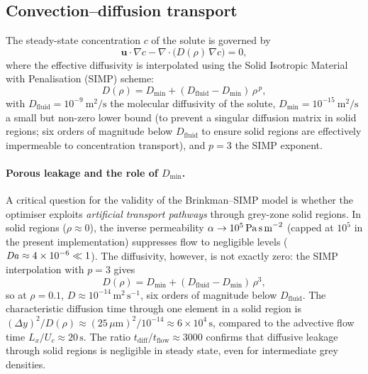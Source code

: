 \subsection{Convection--diffusion transport}
\label{sec:convdiff}
The steady-state concentration \(c\) of the solute is governed by
\begin{equation}
    \mathbf{u}\cdot\nabla c - \nabla\cdot\bigl(D(\rho)\,\nabla c\bigr) = 0,
    \label{eq:convdiff}
\end{equation}
where the effective diffusivity is interpolated using the Solid Isotropic Material with Penalisation (SIMP) scheme:
\begin{equation}
    D(\rho) = D_{\min} + (D_{\text{fluid}} - D_{\min})\,\rho^{\,p},
    \label{eq:Dinterp}
\end{equation}
with \(D_{\text{fluid}} = 10^{-9}\ \text{m}^2/\text{s}\) the molecular diffusivity of the solute, \(D_{\min}=10^{-15}\ \text{m}^2/\text{s}\) a small but non-zero lower bound (to prevent a singular diffusion matrix in solid regions; six orders of magnitude below \(D_{\text{fluid}}\) to ensure solid regions are effectively impermeable to concentration transport), and \(p=3\) the SIMP exponent.

\paragraph{Porous leakage and the role of $D_{\min}$.}
\label{para:leakage}
A critical question for the validity of the Brinkman--SIMP model is
whether the optimiser exploits \emph{artificial transport pathways}
through grey-zone solid regions.
In solid regions ($\rho \approx 0$), the inverse permeability
$\alpha \to 10^{5}\,\text{Pa\,s\,m}^{-2}$ (capped at $10^5$ in the present implementation) suppresses flow to
negligible levels ($\mathit{Da} \approx 4\times10^{-6} \ll 1$).
The diffusivity, however, is not exactly zero: the SIMP interpolation
with $p=3$ gives
\[
  D(\rho) = D_{\min} + (D_{\text{fluid}} - D_{\min})\,\rho^3,
\]
so at $\rho = 0.1$, $D \approx 10^{-14}\,\text{m}^2\,\text{s}^{-1}$,
six orders of magnitude below $D_{\text{fluid}}$.
The characteristic diffusion time through one element in a solid region
is $({\Delta y})^2/D(\rho) \approx (25\,\mu\text{m})^2/10^{-14}
\approx 6\times10^4\,\text{s}$, compared to the advective flow time
$L_x/U_c \approx 20\,\text{s}$.
The ratio $t_{\mathrm{diff}}/t_{\mathrm{flow}} \approx 3000$
confirms that diffusive leakage through solid regions is negligible in
steady state, even for intermediate grey densities.

